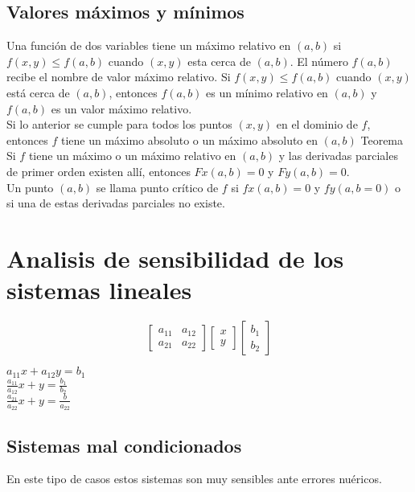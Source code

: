 \subsection*{Valores m\'aximos y m\'inimos}
Una funci\'on de dos variables tiene un m\'aximo relativo en $(a,b)$ si $f(x,y)\leq f(a,b)$ cuando $(x,y)$ esta cerca de $(a,b)$. El n\'umero $f(a,b)$ recibe el nombre de valor m\'aximo relativo. Si $f(x,y)\leq f(a,b)$ cuando $(x,y)$ est\'a cerca de $(a,b)$, entonces $f(a,b)$ es un m\'inimo relativo en $(a,b)$ y $f(a,b)$ es un valor m\'aximo relativo.\\
Si lo anterior se cumple para todos los puntos $(x,y)$ en el dominio de $f$, entonces $f$ tiene un m\'aximo absoluto o un m\'aximo absoluto en $(a,b)$\smallskip 
Teorema\\
Si $f$ tiene un m\'aximo o un m\'aximo relativo en $(a,b)$ y las derivadas parciales de primer orden existen all\'i, entonces $Fx(a,b)=0$ y $Fy(a,b)=0$.\\
Un punto $(a,b)$ se llama punto cr\'itico de $f$ si $fx(a,b)=0$ y $fy(a,b=0)$ o si una de estas derivadas parciales no existe.

\section*{Analisis de sensibilidad de los sistemas lineales}
\begin{displaymath}
\begin{bmatrix}
a_{11} & a_{12} \\
a_{21} & a_{22}
\end{bmatrix}\begin{bmatrix}
x \\ y
\end{bmatrix}\begin{bmatrix}
b_1 \\ b_2
\end{bmatrix}
\end{displaymath}
\begin{center}
$a_{11}x+a_{12}y=b_1$\\
$\frac{a_{11}}{a_{12}}x+y=\frac{b_1}{b_2}$\\
$\frac{a_{21}}{a_{22}}x+y=\frac{b}{a_{22}}$
\end{center}
\subsection*{Sistemas mal condicionados}
En este tipo de casos estos sistemas son muy sensibles ante errores nu\'ericos.
